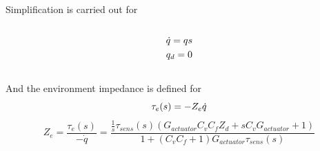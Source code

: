 \documentclass[a4paper,12pt]{article}
\begin{document}
Simplification is carried out for
\begin{equation}
\begin{multlined}\\
\dot{q}=qs\\
q_{d}=0 \\
\end{multlined}\\
\end{equation}
And the environment impedance is defined for
\begin{equation}
\tau_e(s)=-Z_{e}\dot{q}\\
\end{equation}
\begin{equation}
Z_{e}=\frac{\tau_e(s)}{-\dot{q}}=\frac{\frac{1}{s}\tau_{sens}(s)(G_{actuator}C_{v}C_{f}Z_{d}+sC_{v}G_{actuator}+1)}{1+(C_{v}C_{f}+1)G_{actuator}\tau_{sens}(s)}
\end{equation}
\end{document}
